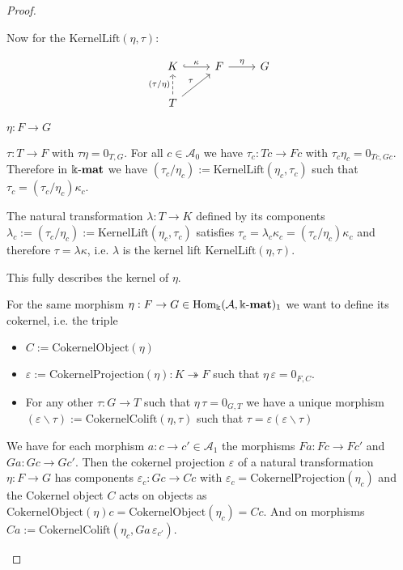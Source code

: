 \begin{proof}
\begin{enumerate}
\begin{subproof}
Now for the $\mathrm{KernelLift}(\eta, \tau)$:

\[
\begin{tikzcd}
K \arrow[r, "\kappa", hook]                                   & F \arrow[r, "\eta"] & G \\
T \arrow[ru, "\tau"] \arrow[u, "(\tau / \eta)", dashed] &                     &  
\end{tikzcd}
\]

$\eta : F \rightarrow G$

$\tau : T \rightarrow F$ with $\tau \eta = 0_{T,G}$. For all $c \in \mathcal{A}_{0}$ we have
$\tau_{c} : Tc \rightarrow Fc$ with $\tau_{c} \eta_{c} = 0_{Tc,Gc}$. Therefore in $\Bbbk\textnormal{-}\mathbf{mat}$ we have
$(\tau_{c} / \eta_{c} ) := \mathrm{KernelLift}( \eta_{c}, \tau_{c} )$ such that $\tau_{c} = (\tau_{c} / \eta_{c} ) \kappa_{c}$.

The natural transformation $\lambda : T \rightarrow K$ defined by its components
$\lambda_{c} := (\tau_{c} / \eta_{c}) := \mathrm{KernelLift}( \eta_{c}, \tau_{c} )$ satisfies
$\tau_{c} = \lambda_{c} \kappa_{c} = (\tau_{c} / \eta_{c} ) \kappa_{c}$ and therefore
$\tau = \lambda \kappa$, i.e. $\lambda$ is the kernel lift $\mathrm{KernelLift}(\eta, \tau)$.

This fully describes the kernel of $\eta$.
\end{subproof}
\begin{subproof}
For the same morphism $\eta : F \rightarrow G \in \mathrm{Hom_{\Bbbk}}(\mathcal{A},\Bbbk\textnormal{-}\mathbf{mat})_{1}$  we want to define its cokernel, i.e. the triple
\begin{itemize}
\item $C := \mathrm{CokernelObject}(\eta)$
\item $\varepsilon := \mathrm{CokernelProjection}(\eta) : K \twoheadrightarrow F$ such that $\eta\,\varepsilon = 0_{F,C}$.
\item For any other $\tau : G \rightarrow T$ such that $\eta\,\tau = 0_{G,T}$ we have a unique morphism
$(\varepsilon \backslash \tau) := \mathrm{CokernelColift}(\eta,\tau)$ such that $\tau = \varepsilon (\varepsilon \backslash \tau)$
\end{itemize}
We have for each morphism $a : c \rightarrow c' \in \mathcal{A}_{1}$ the morphisms $Fa : Fc \rightarrow Fc'$ and
$Ga : Gc \rightarrow Gc'$. Then the cokernel projection $\varepsilon$ of a natural transformation $\eta : F \rightarrow G$ has components
$\varepsilon_{c} : Gc \rightarrow Cc$ with $\varepsilon_{c} = \mathrm{CokernelProjection}(\eta_{c})$ and the Cokernel object $C$ acts on
objects as $\mathrm{CokernelObject}(\eta)c = \mathrm{CokernelObject}(\eta_{c}) = Cc$.
And on morphisms $Ca := \mathrm{CokernelColift}(\eta_{c},Ga\,\varepsilon_{c'})$.


\end{subproof}
\end{enumerate}
\end{proof}
